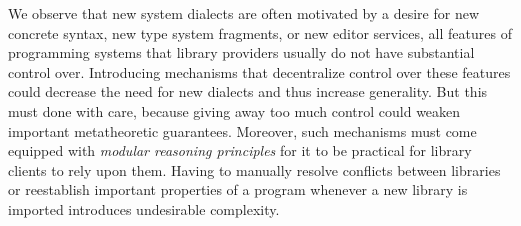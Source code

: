 We observe that new system dialects are often motivated by a desire for new concrete syntax, new type system fragments, or new editor services, all {features} of programming systems that library providers usually do not have substantial control over. %
Introducing mechanisms that decentralize control over these features could decrease the need for new dialects and thus increase generality. But this must done with care, because giving away too much control could weaken important metatheoretic guarantees. Moreover, such  mechanisms must come equipped with \emph{modular reasoning principles} for it to be practical for library clients to rely upon them. Having to manually resolve conflicts between libraries or reestablish important properties of a program whenever a new library is imported introduces undesirable complexity. %

